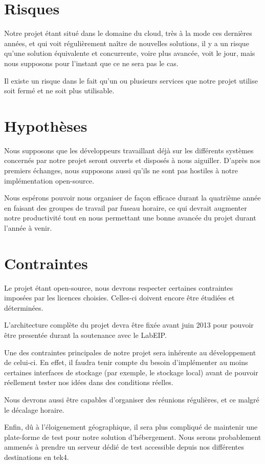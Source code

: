 \section{Risques}
Notre projet étant situé dans le domaine du cloud, très à la mode ces dernières années, et qui voit régulièrement naître de nouvelles solutions, il y a un risque qu'une solution équivalente et concurrente, voire plus avancée, voit le jour, mais nous supposons pour l'instant que ce ne sera pas le cas.

Il existe un risque dans le fait qu'un ou plusieurs services que notre projet utilise soit fermé et ne soit plus utilisable.

\section{Hypothèses}
Nous supposons que les développeurs travaillant déjà sur les différents systèmes concernés par notre projet seront ouverts et disposés à nous aiguiller. D'après nos premiers échanges, nous supposons aussi qu'ils ne sont pas hostiles à notre implémentation open-source.

Nous espérons pouvoir nous organiser de façon efficace durant la quatrième année en faisant des groupes de travail par fuseau horaire, ce qui devrait augmenter notre productivité tout en nous permettant une bonne avancée du projet durant l'année à venir.

\section{Contraintes}
Le projet étant open-source, nous devrons respecter certaines contraintes imposées par les licences choisies. Celles-ci doivent encore être étudiées et déterminées.

L'architecture complète du projet devra être fixée avant juin 2013 pour pouvoir être presentée durant la soutenance avec le LabEIP.

Une des contraintes principales de notre projet sera inhérente au développement de celui-ci. En effet, il faudra tenir compte du besoin d'implémenter au moins certaines interfaces de stockage (par exemple, le stockage local) avant de pouvoir réellement tester nos idées dans des conditions réelles.

Nous devrons aussi être capables d'organiser des réunions régulières, et ce malgré le décalage horaire.

Enfin, dû à l'éloigenement géographique, il sera plus compliqué de maintenir une plate-forme de test pour notre solution d'hébergement. Nous serons probablement ammenés à prendre un serveur dédié de test accessible depuis nos différentes destinations en tek4.

